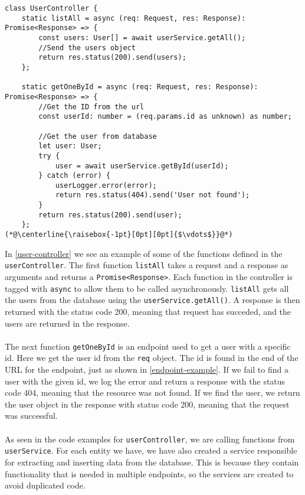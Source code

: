 \begin{lstlisting}[caption={Shows some of the endpoints from the UserController}, captionpos=b, label={user-controller}]
class UserController {
	static listAll = async (req: Request, res: Response): Promise<Response> => {
		const users: User[] = await userService.getAll();
		//Send the users object
		return res.status(200).send(users);
    };

    static getOneById = async (req: Request, res: Response): Promise<Response> => {
		//Get the ID from the url
		const userId: number = (req.params.id as unknown) as number;

		//Get the user from database
		let user: User;
		try {
			user = await userService.getById(userId);
		} catch (error) {
			userLogger.error(error);
			return res.status(404).send('User not found');
		}
		return res.status(200).send(user);
	};
(*@\centerline{\raisebox{-1pt}[0pt][0pt]{$\vdots$}}@*)
\end{lstlisting}
In \autoref{user-controller} we see an example of some of the functions defined in the \texttt{userController}.
The first function \texttt{listAll} takes a request and a response as arguments and returns a \texttt{Promise<Response>}.
Each function in the controller is tagged with \texttt{async} to allow them to be called asynchronously. 
\texttt{listAll} gets all the users from the database using the \texttt{userService.getAll()}.
A response is then returned with the status code 200, meaning that request has succeded, and the users are returned in the response. 
\\\\
The next function \texttt{getOneById} is an endpoint used to get a user with a specific id. 
Here we get the user id from the \texttt{req} object. 
The id is found in the end of the URL for the endpoint, just as shown in \autoref{endpoint-example}.
If we fail to find a user with the given id, we log the error and return a response with the status code 404, meaning that the resource was not found.
If we find the user, we return the user object in the response with status code 200, meaning that the request was successful.
\\\\
As seen in the code examples for \texttt{userController}, we are calling functions from \texttt{userService}. 
For each entity we have, we have also created a service responsible for extracting and inserting data from the database.
This is because they contain functionality that is needed in multiple endpoints, so the services are created to avoid duplicated code.
